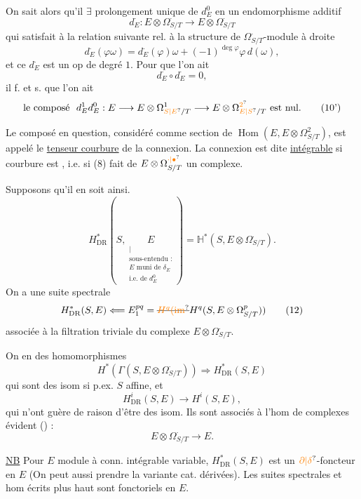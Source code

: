 On sait alors qu'il $\exists$ prolongement unique de
$d_E^0$ en  un endomorphisme
additif
\[
d_E^{\cdot}:E\otimes\Omega^{\cdot}_{S/T}\longrightarrow E\otimes\Omega^{\cdot}_{S/T} \tag*{(8)}
\]
qui  satisfait à la relation suivante
rel. à la structure de $\Omega^{\cdot}_{S/T}$-module à droite
\[
d_E^{\cdot}(\varphi\omega)=d_E^{\cdot}(\varphi)\omega+
 (-1)^{\deg\varphi}\varphi\,d(\omega), \tag*{(9)}
\]
et ce $d_E^{\cdot}$ est un op de degré $1$. Pour que
l'on ait
\[
d_E^{\cdot}\circ d_E^{\cdot}=0, \tag*{(10)}
\]
il f. et s. que l'on ait
\[
\text{le composé }\ d_E^1d_E^0:E\longrightarrow E\otimes\Omega^1_{\unsure{S|E}/T}
\longrightarrow E\otimes\Omega^{\unsure{2}}_{\unsure{E|S}/T}\ \text{est nul.} \tag*{(10')}
\]

Le composé en question, considéré comme section
de $\operatorname{Hom}(E,E\otimes\Omega^2_{S/T})$, est appelé le \uline{tenseur courbure}
de la connexion. La connexion est dite \uline{intégrable}
si   courbure est , i.e. si  (8) fait
de $E\otimes\Omega^{\unsure{\cdot|\bullet}}_{S/T}$ un complexe.

Supposons qu'il en soit ainsi. 
\[
H^*_{\mathrm{DR}}(S,\underset{\substack{|\\\text{sous-entendu :}\\ E\text{ muni de }\delta_E\\
\text{i.e. de }d_E^0}}{E})=\mathbb H^*(S,E\otimes\Omega^{\cdot}_{S/T}). \tag*{(11)}
\]
On a une suite spectrale
\[
H^*_{\mathrm{DR}}(S,E)\Longleftarrow E_1^{pq}=
\deleted{\unsure{H^q(\mathrm{im}}}H^q(S,E\otimes\Omega^p_{S/T})) \tag*{(12)}
\]
associée à la filtration triviale du complexe $E\otimes\Omega^{\cdot}_{S/T}$.

On en  des  homomorphismes
\[
H^*(\Gamma(S,E\otimes\Omega^{\cdot}_{S/T}))\Longrightarrow H^*_{\mathrm{DR}}(S,E) \tag*{(13)}
\]
qui sont des isom si p.ex. $S$ affine, et
\[
H^i_{\mathrm{DR}}(S,E)\longrightarrow H^i(S,E), \tag*{(14)}
\]
qui n'ont guère de raison d'être des isom. Ils sont
associés à l'hom de complexes évident () :
\[
E\otimes\Omega^{\cdot}_{S/T}\longrightarrow E. \tag*{(15)}
\]

\uline{NB} Pour $E$ module à conn. intégrable variable,
$H^*_{\mathrm{DR}}(S,E)$ est un $\unsure{\partial|\delta}$-foncteur en $E$ (On peut aussi
prendre la variante cat. dérivées). Les suites spectrales
et hom écrits plus haut sont fonctoriels en $E$.

